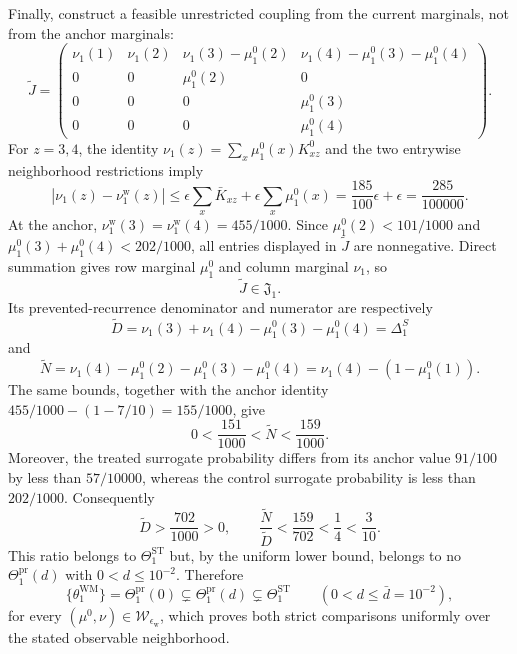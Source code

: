 Finally, construct a feasible unrestricted coupling from the current marginals, not from the anchor marginals:
\[
 \widetilde J=
 \begin{pmatrix}
 \nu_1(1)&\nu_1(2)&\nu_1(3)-\mu_1^0(2)&\nu_1(4)-\mu_1^0(3)-\mu_1^0(4)\\
 0&0&\mu_1^0(2)&0\\
 0&0&0&\mu_1^0(3)\\
 0&0&0&\mu_1^0(4)
 \end{pmatrix}.
\]
For \(z=3,4\), the identity \(\nu_1(z)=\sum_x\mu_1^0(x)K^0_{xz}\) and the two entrywise neighborhood restrictions imply
\[
 \left|\nu_1(z)-\nu_1^{\mathrm w}(z)\right|
 \le\epsilon\sum_x\bar K_{xz}+\epsilon\sum_x\mu_1^0(x)
 =\frac{185}{100}\epsilon+\epsilon
 =\frac{285}{100000}.
\]
At the anchor, \(\nu_1^{\mathrm w}(3)=\nu_1^{\mathrm w}(4)=455/1000\). Since \(\mu_1^0(2)<101/1000\) and \(\mu_1^0(3)+\mu_1^0(4)<202/1000\), all entries displayed in \(\widetilde J\) are nonnegative. Direct summation gives row marginal \(\mu_1^0\) and column marginal \(\nu_1\), so
\[
 \widetilde J\in\mathfrak J_1.
\]
Its prevented-recurrence denominator and numerator are respectively
\[
 \widetilde D=\nu_1(3)+\nu_1(4)-\mu_1^0(3)-\mu_1^0(4)=\Delta_1^S
\]
and
\[
 \widetilde N=\nu_1(4)-\mu_1^0(2)-\mu_1^0(3)-\mu_1^0(4)
 =\nu_1(4)-(1-\mu_1^0(1)).
\]
The same bounds, together with the anchor identity \(455/1000-(1-7/10)=155/1000\), give
\[
 0<\frac{151}{1000}<\widetilde N<\frac{159}{1000}.
\]
Moreover, the treated surrogate probability differs from its anchor value \(91/100\) by less than \(57/10000\), whereas the control surrogate probability is less than \(202/1000\). Consequently
\[
 \widetilde D>\frac{702}{1000}>0,
 \qquad
 \frac{\widetilde N}{\widetilde D}
 <\frac{159}{702}<\frac14<\frac3{10}.
\]
This ratio belongs to \(\Theta_1^{\mathrm{ST}}\) but, by the uniform lower bound, belongs to no \(\Theta_1^{\mathrm{pr}}(d)\) with \(0<d\le10^{-2}\). Therefore
\[
 \{\theta_1^{\mathrm{WM}}\}=\Theta_1^{\mathrm{pr}}(0)
 \subsetneq\Theta_1^{\mathrm{pr}}(d)
 \subsetneq\Theta_1^{\mathrm{ST}}
 \qquad(0<d\le\bar d=10^{-2}),
\]
for every \((\mu^0,\nu)\in\mathcal W_{\epsilon_{\mathrm w}}\), which proves both strict comparisons uniformly over the stated observable neighborhood.